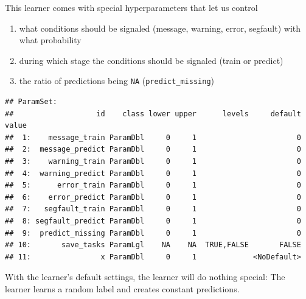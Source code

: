 \documentclass[]{scrbook}
\newenvironment{Shaded}{\begin{snugshade}}{\end{snugshade}}
\newcommand{\KeywordTok}[1]{\textcolor[rgb]{0.13,0.29,0.53}{\textbf{#1}}}
\newcommand{\NormalTok}[1]{#1}
\newcommand{\OperatorTok}[1]{\textcolor[rgb]{0.81,0.36,0.00}{\textbf{#1}}}
\newcommand{\StringTok}[1]{\textcolor[rgb]{0.31,0.60,0.02}{#1}}
\providecommand{\tightlist}{%
  \setlength{\itemsep}{0pt}\setlength{\parskip}{0pt}}
\renewenvironment{Shaded} {\begin{snugshade}\small} {\end{snugshade}}
\begin{document}
This learner comes with special hyperparameters that let us control

\begin{enumerate}
\def\labelenumi{\arabic{enumi}.}
\tightlist
\item
  what conditions should be signaled (message, warning, error, segfault) with what probability
\item
  during which stage the conditions should be signaled (train or predict)
\item
  the ratio of predictions being \texttt{NA} (\texttt{predict\_missing})
\end{enumerate}

\begin{Shaded}
\end{Shaded}

\begin{verbatim}
## ParamSet: 
##                   id    class lower upper      levels     default value
##  1:    message_train ParamDbl     0     1                       0      
##  2:  message_predict ParamDbl     0     1                       0      
##  3:    warning_train ParamDbl     0     1                       0      
##  4:  warning_predict ParamDbl     0     1                       0      
##  5:      error_train ParamDbl     0     1                       0      
##  6:    error_predict ParamDbl     0     1                       0      
##  7:   segfault_train ParamDbl     0     1                       0      
##  8: segfault_predict ParamDbl     0     1                       0      
##  9:  predict_missing ParamDbl     0     1                       0      
## 10:       save_tasks ParamLgl    NA    NA  TRUE,FALSE       FALSE      
## 11:                x ParamDbl     0     1             <NoDefault>
\end{verbatim}

With the learner's default settings, the learner will do nothing special: The learner learns a random label and creates constant predictions.

\begin{Shaded}
\end{Shaded}
\end{document}
